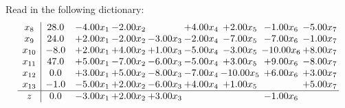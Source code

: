 \documentclass[9pt]{article}
\begin{document}
Read in the following dictionary:
\[\begin{array}{c| c c@{\hskip 2pt} c@{\hskip 2pt} c@{\hskip 2pt} c@{\hskip 2pt} c@{\hskip 2pt} c@{\hskip 2pt} c@{\hskip 2pt} }
 x_{8}   &  28.0 & -4.00 x_{1} & -2.00 x_{2} &   & +  4.00 x_{4} & +  2.00 x_{5} & -1.00 x_{6} & -5.00 x_{7}\\
 x_{9}   &  24.0 & +  2.00 x_{1} & -2.00 x_{2} & -3.00 x_{3} & -2.00 x_{4} & -7.00 x_{5} & -7.00 x_{6} & -1.00 x_{7}\\
 x_{10}   &  -8.0 & +  2.00 x_{1} & +  4.00 x_{2} & +  1.00 x_{3} & -5.00 x_{4} & -3.00 x_{5} & -10.00 x_{6} & +  8.00 x_{7}\\
 x_{11}   &  47.0 & +  5.00 x_{1} & -7.00 x_{2} & -6.00 x_{3} & -5.00 x_{4} & +  3.00 x_{5} & +  9.00 x_{6} & -8.00 x_{7}\\
 x_{12}   &  0.0 & +  3.00 x_{1} & +  5.00 x_{2} & -8.00 x_{3} & -7.00 x_{4} & -10.00 x_{5} & +  6.00 x_{6} & +  3.00 x_{7}\\
 x_{13}   &  -1.0 & -5.00 x_{1} & +  2.00 x_{2} & -6.00 x_{3} & +  4.00 x_{4} & +  1.00 x_{5} &   & +  5.00 x_{7}\\
\hline
z    &  0.0 & -3.00 x_{1} & +  2.00 x_{2} & +  3.00 x_{3} &    &   & -1.00 x_{6} &   \\
\end{array}\]
\end{document}
